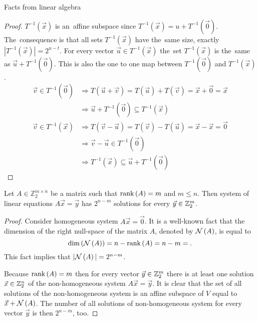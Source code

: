 \begin{chapter}{Facts from linear algebra}
\begin{proof}
$T^{-1}(\vec{x})$ is an~affine subspace since $T^{-1}(\vec{x}) = u + T^{-1}(\vec{0})$. The~consequence is that all sets $T^{-1}(\vec{x})$ have the~same size, exactly $|T^{-1}(\vec{x})| = 2^{u-t}$. For every vector $\vec{u} \in T^{-1}(\vec{x})$ the~set $T^{-1}(\vec{x})$ is the~same as $\vec{u} + T^{-1}(\vec{0})$. This is also the one to one map between $T^{-1}(\vec{0})$ and $T^{-1}(\vec{x})$.
\begin{displaymath}
\begin{split}
\vec{v} \in T^{-1}(\vec{0}) 
	& \Rightarrow T(\vec{u} + \vec{v}) = T(\vec{u}) + T(\vec{v}) = \vec{x} + \vec{0} = \vec{x}  \\
	& \Rightarrow \vec{u} + T^{-1}(\vec{0}) \subseteq T^{-1}(\vec{x})
\end{split}
\end{displaymath}
\begin{displaymath}
\begin{split}
\vec{v} \in T^{-1}(\vec{x}) 
	& \Rightarrow T(\vec{v} - \vec{u}) = T(\vec{v}) - T(\vec{u}) = \vec{x} - \vec{x} = \vec{0} \\
	& \Rightarrow \vec{v} - \vec{u} \in T^{-1}(\vec{0}) \\
	& \Rightarrow T^{-1}(\vec{x}) \subseteq \vec{u} + T^{-1}(\vec{0})
\end{split}
\end{displaymath}
\end{proof}

\begin{lemma}
\label{lemma-system-of-linear-equations-solution-count}
Let $A \in \mathbb{Z}_2^{m \times n}$ be a matrix such that $\mathrm{rank}\left({A}\right) = m$ and $m \leq n$. Then system of linear equations $A\vec{x} = \vec{y}$ has $2 ^ {n - m}$ solutions for every $\vec{y} \in \mathbb{Z}_{2}^{m}$.
\end{lemma}
\begin{proof}
Consider homogeneous system $A\vec{x} = \vec{0}$. It is a well-known fact that the dimension of the right null-space of the matrix $A$, denoted by $\mathcal{N}\left({A}\right)$, is equal to \[ \mathrm{dim}\left({\mathcal{N}\left({A}\right)}\right) =n - \mathrm{rank}\left({A}\right) = n - m = \text{.} \] This fact implies that $|\mathcal{N}\left({A}\right)| = 2 ^ {n - m}$.

Because $\mathrm{rank}\left({A}\right) = m$ then for every vector $\vec{y} \in \mathbb{Z}_{2}^{m}$ there is at least one solution $\vec{x} \in \mathbb{Z}_{2}^{n}$ of the non-homogeneous system $A\vec{x} = \vec{y}$. It is clear that the set of all solutions of the non-homogeneous system is an affine subspace of $V$ equal to $\vec{x} + \mathcal{N}\left({A}\right)$. The number of all solutions of non-homogeneous system for every vector $\vec{y}$ is then $2 ^ {n - m}$, too.
\end{proof}
\end{chapter}
